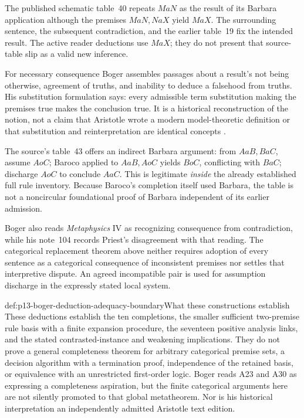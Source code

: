 The published schematic table~40 repeats \(MaN\) as the result of its
Barbara application although the premises \(MaN,NaX\) yield \(MaX\).
The surrounding sentence, the subsequent contradiction, and the earlier
table~19 fix the intended result. The active reader deductions use \(MaX\);
they do not present that source-table slip as a valid new inference.

For necessary consequence Boger assembles passages about a result's not being
otherwise, agreement of truths, and inability to deduce a falsehood from truths.
His substitution formulation says: every admissible term substitution making
the premises true makes the conclusion true. It is a historical reconstruction
of the notion, not a claim that Aristotle wrote a modern model-theoretic
definition or that substitution and reinterpretation are identical concepts
\parencite[pp.~230--235, 242--243]{Boger2004UnderlyingLogic}.

The source's table~43 offers an indirect Barbara argument: from \(AaB,BaC\),
assume \(AoC\); Baroco applied to \(AaB,AoC\) yields \(BoC\), conflicting
with \(BaC\); discharge \(AoC\) to conclude \(AaC\). This is legitimate
\emph{inside} the already established full rule inventory. Because Baroco's
completion itself used Barbara, the table is not a noncircular foundational
proof of Barbara independent of its earlier admission.

Boger also reads \emph{Metaphysics} IV as recognizing consequence from
contradiction, while his note~104 records Priest's disagreement with that
reading. The categorical replacement theorem above neither requires adoption
of every sentence as a categorical consequence of inconsistent premises nor
settles that interpretive dispute. An agreed incompatible pair is used for
assumption discharge in the expressly stated local system.

\begin{proofboundary}{def:p13-boger-deduction-adequacy-boundary}{What these constructions establish}
These deductions establish the ten completions, the smaller sufficient
two-premise rule basis with a finite expansion procedure, the seventeen positive
analysis links, and the stated contrasted-instance and weakening implications.
They do not prove a general completeness theorem for arbitrary categorical
premise sets, a decision algorithm with a termination proof, independence of
the retained basis, or equivalence with an unrestricted first-order logic.
Boger reads A23 and A30 as expressing a completeness aspiration, but the
finite categorical arguments here are not silently promoted to that global
metatheorem. Nor is his historical interpretation an independently admitted
Aristotle text edition.
\end{proofboundary}

